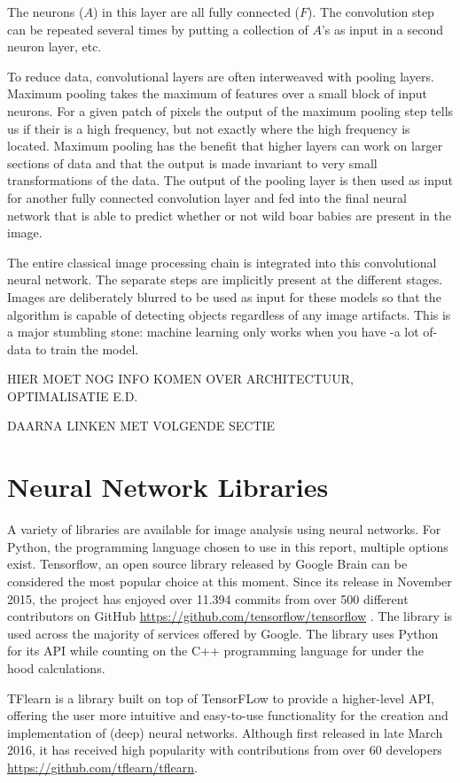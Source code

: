 The neurons ($A$) in this layer are all fully connected ($F$). The convolution step can be repeated several times by putting a collection of  $A$\textquoteright  s as input in a second neuron layer, etc.
 
To reduce data, convolutional layers are often interweaved with pooling layers. Maximum pooling takes the maximum of features over a small block of input neurons. For a given patch of pixels the output of the maximum pooling step tells us if their is a high frequency, but not exactly where the high frequency is located. Maximum pooling has the benefit that higher layers can work on larger sections of data and that the output is made invariant to very small transformations of the data.
The output of the pooling layer is then used as input for another fully connected convolution layer and fed into the final neural network that is able to predict whether or not wild boar babies are present in the image. 


The entire classical image processing chain is integrated into this convolutional neural network. The separate steps are implicitly present at the different stages. Images are deliberately blurred to be used as input for these models so that the algorithm is capable of detecting objects regardless of any image artifacts. This is a major stumbling stone: machine learning only works when you have -a lot of- data to train the model. 

HIER MOET NOG INFO KOMEN OVER ARCHITECTUUR, OPTIMALISATIE E.D.

DAARNA LINKEN MET VOLGENDE SECTIE

\section{Neural Network Libraries \label{sec:libraries}}
A variety of libraries are available for image analysis using neural networks. For Python, the programming language chosen to use in this report, multiple options exist. Tensorflow, an open source library released by Google Brain can be considered the most popular choice at this moment. Since its release in November 2015, the project has enjoyed over 11.394 commits from over 500 different contributors on GitHub \url{https://github.com/tensorflow/tensorflow} . The library is used across the majority of services offered by Google. The library uses Python for its API while counting on the C++ programming language for under the hood calculations. 


TFlearn is a library built on top of TensorFLow to provide a higher-level API, offering the user more intuitive and easy-to-use functionality for the creation and implementation of (deep) neural networks. Although first released in late March 2016, it has received high popularity with contributions from over 60 developers \url{https://github.com/tflearn/tflearn}.
 
